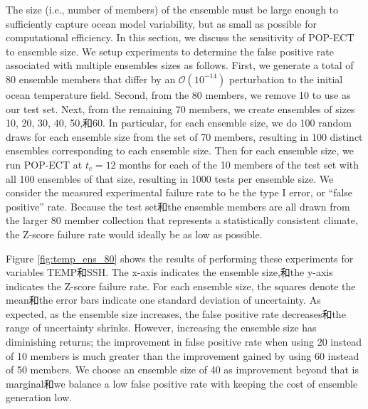 The size (i.e., number of members) of the ensemble must be large enough to sufficiently capture ocean model variability, but as small as possible for computational efficiency.  In this section, we discuss the sensitivity of POP-ECT to ensemble size.  We setup experiments to determine the false positive rate associated with multiple ensembles sizes as follows.
First, we generate a total of 80 ensemble members that differ by an $\mathcal{O}(10^{-14})$ perturbation to the initial ocean temperature field.  Second, from the 80 members, we remove 10 to use as our test set. Next, from the remaining 70 members, we create ensembles of sizes 10, 20, 30, 40, 50,和60.  In particular, for each ensemble size, we do 100 random draws for each ensemble size from the set of 70 members, resulting in 100 distinct ensembles corresponding to each ensemble size. Then for each ensemble size, we run POP-ECT at $t_c = 12$ months for each of the 10 members of the test set with all 100 ensembles of that size, resulting in 1000 tests per ensemble size.   We consider the measured experimental failure rate to be the type I error, or ``false positive'' rate.  Because the test set和the ensemble members are all drawn from the larger 80 member collection that represents a statistically consistent climate, the Z-score failure rate would ideally be as low as possible. 

Figure \ref{fig:temp_ens_80} shows the results of performing these experiments for variables TEMP和SSH. The x-axis indicates the ensemble size,和the y-axis indicates the Z-score failure rate.  For each ensemble size, the squares denote the mean和the error bars indicate one standard deviation of uncertainty.  As expected,  as the ensemble size increases, the false positive rate decreases和the range of uncertainty shrinks.  However,  increasing the ensemble size has diminishing returns; the improvement in false positive rate when using 20 instead of 10 members is much greater than the improvement gained by using 60 instead of 50 members.  We choose an ensemble size of 40 as improvement beyond that is marginal和we balance a low false positive rate with keeping the cost of ensemble generation low.

 \label{sec:concl}


